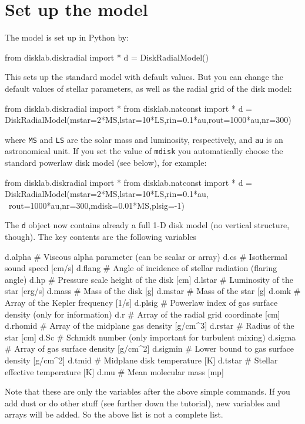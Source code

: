 \documentclass{book}
\newcommand{\code}[1]{{\small\tt #1}}
\begin{document}
\section{Set up the model}
The model is set up in Python by:
\begin{codebox}
from disklab.diskradial import *
d = DiskRadialModel()
\end{codebox}
This sets up the standard model with default values. But you can change the
default values of stellar parameters, as well as the radial grid of the disk model:
\begin{codebox}
from disklab.diskradial import *
from disklab.natconst import *
d = DiskRadialModel(mstar=2*MS,lstar=10*LS,rin=0.1*au,rout=1000*au,nr=300)
\end{codebox}
where \code{MS} and \code{LS} are the solar mass and luminosity, respectively,
and \code{au} is an astronomical unit.  If you set the value of \code{mdisk} you
automatically choose the standard powerlaw disk model (see below), for example:
\begin{codebox}
from disklab.diskradial import *
from disklab.natconst import *
d = DiskRadialModel(mstar=2*MS,lstar=10*LS,rin=0.1*au, \
              rout=1000*au,nr=300,mdisk=0.01*MS,plsig=-1)
\end{codebox}
The \code{d} object now contains already a full 1-D disk model (no vertical
structure, though). The key contents are the following variables
\begin{codebox}
d.alpha     # Viscous alpha parameter (can be scalar or array)
d.cs        # Isothermal sound speed [cm/s]
d.flang     # Angle of incidence of stellar radiation (flaring angle)
d.hp        # Pressure scale height of the disk [cm]
d.lstar     # Luminosity of the star [erg/s]
d.mass      # Mass of the disk [g]
d.mstar     # Mass of the star [g]
d.omk       # Array of the Kepler frequency [1/s]
d.plsig     # Powerlaw index of gas surface density (only for information)
d.r         # Array of the radial grid coordinate [cm]
d.rhomid    # Array of the midplane gas density [g/cm^3]
d.rstar     # Radius of the star [cm]
d.Sc        # Schmidt number (only important for turbulent mixing)
d.sigma     # Array of gas surface density [g/cm^2]
d.sigmin    # Lower bound to gas surface density [g/cm^2]
d.tmid      # Midplane disk temperature [K]
d.tstar     # Stellar effective temperature [K]
d.mu        # Mean molecular mass [mp]
\end{codebox}
Note that these are only the variables after the above simple commands. If you
add dust or do other stuff (see further down the tutorial), new variables and
arrays will be added. So the above list is not a complete list.
\end{document}
